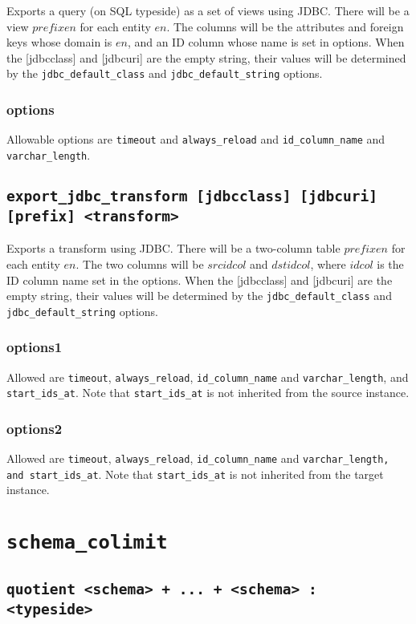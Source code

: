 \documentclass[10pt]{book}
\begin{document}
Exports a query (on SQL typeside) as a set of views using JDBC.  There will be a view $prefixen$ for each entity $en$.  The columns will be the attributes and foreign keys whose domain is $en$, and an ID column whose name is set in options.  When the [jdbcclass] and [jdbcuri] are the empty string, their values will be determined by the {\tt jdbc\_default\_class} and {\tt jdbc\_default\_string} options.

\subsection{options}
Allowable options are {\tt timeout}  and {\tt always\_reload} and  {\tt id\_column\_name} and {\tt varchar\_length}.



\section{{\tt export\_jdbc\_transform [jdbcclass] [jdbcuri] [prefix] <transform>}}
Exports a transform using JDBC.  There will be a two-column table $prefixen$ for each entity $en$.  The two columns will be $srcidcol$ and $dstidcol$, where $idcol$ is the ID column name set in the options.   When the [jdbcclass] and [jdbcuri] are the empty string, their values will be determined by the {\tt jdbc\_default\_class} and {\tt jdbc\_default\_string} options.

\subsection{options1}
Allowed are {\tt timeout}, {\tt always\_reload},  {\tt id\_column\_name} and {\tt varchar\_length}, and {\tt start\_ids\_at}.  Note that {\tt start\_ids\_at} is not inherited from the source instance.
\subsection{options2}
Allowed are {\tt timeout}, {\tt always\_reload},  {\tt id\_column\_name} and {\tt varchar\_length, and {\tt start\_ids\_at}}.  Note that {\tt start\_ids\_at} is not inherited from the target instance.

\chapter{{\tt schema\_colimit}}

\section{{\tt quotient <schema> + ... + <schema> : <typeside>}}
\end{document}
